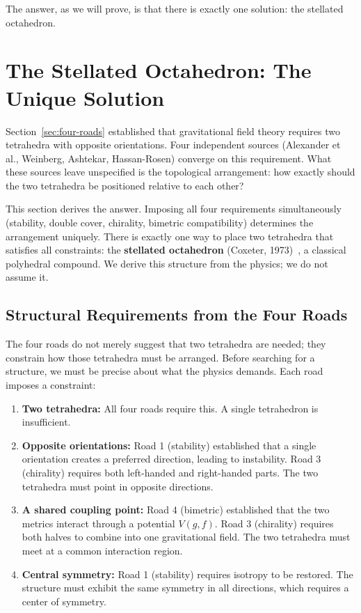\documentclass[aps,prd,preprint,superscriptaddress,showpacs,preprintnumbers,amsmath,amssymb,nofootinbib]{revtex4-2}
\begin{document}
The answer, as we will prove, is that there is exactly one solution: the stellated octahedron.

\section{The Stellated Octahedron: The Unique Solution}
\label{sec:stellated}

Section~\ref{sec:four-roads} established that gravitational field theory requires two tetrahedra with opposite orientations. Four independent sources (Alexander et al., Weinberg, Ashtekar, Hassan-Rosen) converge on this requirement. What these sources leave unspecified is the topological arrangement: how exactly should the two tetrahedra be positioned relative to each other?

This section derives the answer. Imposing all four requirements simultaneously (stability, double cover, chirality, bimetric compatibility) determines the arrangement uniquely. There is exactly one way to place two tetrahedra that satisfies all constraints: the \textbf{stellated octahedron} (Coxeter, 1973)~\cite{coxeter1973}, a classical polyhedral compound. We derive this structure from the physics; we do not assume it.

\subsection{Structural Requirements from the Four Roads}
\label{subsec:requirements}

The four roads do not merely suggest that two tetrahedra are needed; they constrain how those tetrahedra must be arranged. Before searching for a structure, we must be precise about what the physics demands. Each road imposes a constraint:

\begin{enumerate}
\item \textbf{Two tetrahedra:} All four roads require this. A single tetrahedron is insufficient.
\item \textbf{Opposite orientations:} Road 1 (stability) established that a single orientation creates a preferred direction, leading to instability. Road 3 (chirality) requires both left-handed and right-handed parts. The two tetrahedra must point in opposite directions.
\item \textbf{A shared coupling point:} Road 4 (bimetric) established that the two metrics interact through a potential $V(g,f)$. Road 3 (chirality) requires both halves to combine into one gravitational field. The two tetrahedra must meet at a common interaction region.
\item \textbf{Central symmetry:} Road 1 (stability) requires isotropy to be restored. The structure must exhibit the same symmetry in all directions, which requires a center of symmetry.
\end{enumerate}
\end{document}
